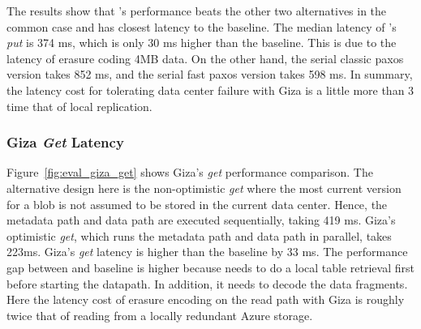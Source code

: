 The results show that \name's performance beats the other two alternatives in
the common case and has closest latency to the baseline. The median latency of
\name's {\em put} is 374 ms, which is only 30 ms higher than the baseline. This
is due to the latency of erasure coding 4MB data. On the other hand, the serial
classic paxos version takes 852 ms, and the serial fast paxos version takes 598
ms. In summary, the latency cost for tolerating data center failure with Giza is
a little more than 3 time that of local replication.

\subsubsection{Giza {\em Get} Latency}

Figure~\ref{fig:eval_giza_get} shows Giza's {\em get} performance comparison.
The alternative design here is the non-optimistic {\em get } where the most
current version for a blob is not assumed to be stored in the current data
center. Hence, the metadata path and data path are executed sequentially, taking
419 ms. Giza's optimistic {\em get}, which runs the metadata path and data path
in parallel, takes 223ms. Giza's {\em get} latency is higher than the baseline
by 33 ms. The performance gap between \name and baseline is higher because \name
needs to do a local table retrieval first before starting the datapath. In
addition, it needs to decode the data fragments. Here the latency cost of
erasure encoding on the read path with Giza is roughly twice that of reading
from a locally redundant Azure storage.






